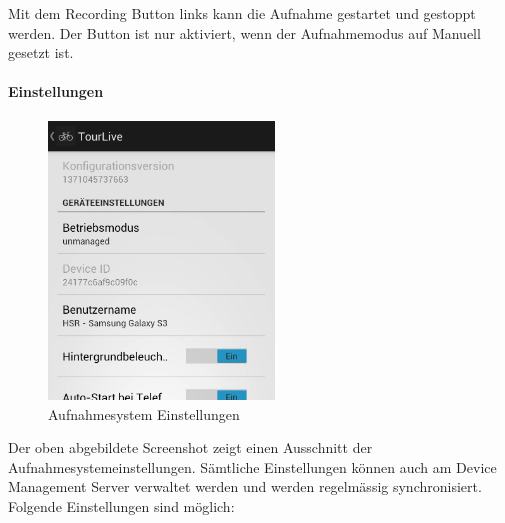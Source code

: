 Mit dem Recording Button links kann die Aufnahme gestartet und gestoppt werden. Der Button ist nur aktiviert, wenn der Aufnahmemodus auf Manuell gesetzt ist.

\paragraph{Einstellungen}
\begin{figure}[H]
	\centering
	\includegraphics[width=60mm]{images/android/settings.png}
	\caption{Aufnahmesystem Einstellungen}
\end{figure}

Der oben abgebildete Screenshot zeigt einen Ausschnitt der Aufnahmesystemeinstellungen. Sämtliche Einstellungen können auch am Device Management Server verwaltet werden und werden regelmässig synchronisiert. Folgende Einstellungen sind möglich:

